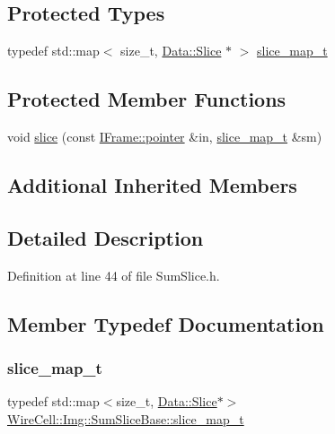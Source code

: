 \subsection*{Protected Types}
\begin{DoxyCompactItemize}
\item 
typedef std\+::map$<$ size\+\_\+t, \hyperlink{class_wire_cell_1_1_img_1_1_data_1_1_slice}{Data\+::\+Slice} $\ast$ $>$ \hyperlink{class_wire_cell_1_1_img_1_1_sum_slice_base_a282d10c443ad41866ab0595af2c56e54}{slice\+\_\+map\+\_\+t}
\end{DoxyCompactItemize}
\subsection*{Protected Member Functions}
\begin{DoxyCompactItemize}
\item 
void \hyperlink{class_wire_cell_1_1_img_1_1_sum_slice_base_a173581daeeac8e467120be1a0a9eea82}{slice} (const \hyperlink{class_wire_cell_1_1_i_data_aff870b3ae8333cf9265941eef62498bc}{I\+Frame\+::pointer} \&in, \hyperlink{class_wire_cell_1_1_img_1_1_sum_slice_base_a282d10c443ad41866ab0595af2c56e54}{slice\+\_\+map\+\_\+t} \&sm)
\end{DoxyCompactItemize}
\subsection*{Additional Inherited Members}


\subsection{Detailed Description}


Definition at line 44 of file Sum\+Slice.\+h.



\subsection{Member Typedef Documentation}
\mbox{\label{class_wire_cell_1_1_img_1_1_sum_slice_base_a282d10c443ad41866ab0595af2c56e54}} 
\subsubsection{\texorpdfstring{slice\+\_\+map\+\_\+t}{slice\_map\_t}}
{\footnotesize\ttfamily typedef std\+::map$<$size\+\_\+t, \hyperlink{class_wire_cell_1_1_img_1_1_data_1_1_slice}{Data\+::\+Slice}$\ast$$>$ \hyperlink{class_wire_cell_1_1_img_1_1_sum_slice_base_a282d10c443ad41866ab0595af2c56e54}{Wire\+Cell\+::\+Img\+::\+Sum\+Slice\+Base\+::slice\+\_\+map\+\_\+t}\hspace{0.3cm}{\ttfamily [protected]}}




